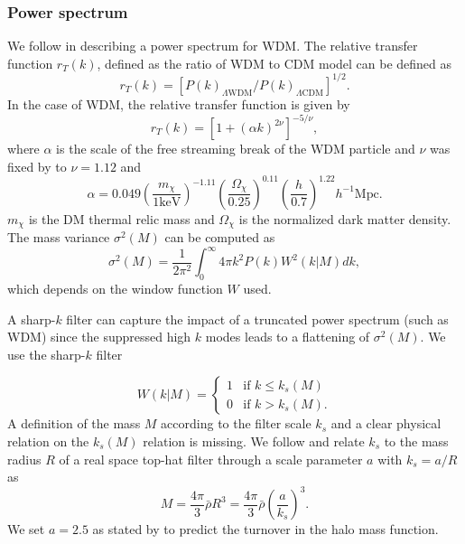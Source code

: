 \documentclass[a4paper,11pt]{article}
\begin{document}
\subsubsection{Power spectrum}\label{sec:power_spectrum}
We follow \cite{Viel:2005p13838} in describing a power spectrum for WDM. The relative transfer function $r_T(k)$, defined as the ratio of WDM to CDM model can be defined as
\begin{equation}
	r_T(k) = \left[P(k)_{\text{$\Lambda$WDM}}/P(k)_{\text{$\Lambda$CDM}} \right]^{1/2}.
\end{equation}
In the case of WDM, the relative transfer function is given by \cite{Bode:2001p13951}
\begin{equation}
	r_T(k) = \left[1 + \left(\alpha k \right)^{2\nu}\right]^{-5/\nu},
\end{equation}
where $\alpha$ is the scale of the free streaming break of the WDM particle and $\nu$ was fixed by \cite{Viel:2005p13838} to $\nu = 1.12$ and
\begin{equation}
	\alpha = 0.049 \left(\frac{m_{\chi}}{1\text{keV}}\right)^{-1.11} \left(\frac{\Omega_{\chi}}{0.25}\right)^{0.11} \left(\frac{h}{0.7}\right)^{1.22}h^{-1}\text{Mpc}.
\end{equation}
$m_{\chi}$ is the DM thermal relic mass and $\Omega_{\chi}$ is the normalized dark matter density. The mass variance $\sigma^2(M)$ can be computed as
\begin{equation}
	\sigma^2(M) = \frac{1}{2\pi^2} \int_0^{\infty} 4 \pi k^2 P(k) W^2(k|M)dk,
\end{equation}
which depends on the window function $W$ used. 

A sharp-$k$ filter can capture the impact of a truncated power spectrum (such as WDM) since the suppressed high $k$ modes leads to a flattening of $\sigma^2(M)$. We use the sharp-$k$ filter

\begin{equation}
	W(k|M) =
	\begin{cases}
    1 & \text{if } k \le k_s(M)\\
    0 & \text{if } k > k_s(M).
	\end{cases}
\end{equation}
A definition of the mass $M$ according to the filter scale $k_s$ and a clear physical relation on the $k_s(M)$ relation is missing. We follow \cite{Benson:2013p13572} and relate $k_s$ to the mass radius $R$ of a real space top-hat filter through a scale parameter $a$ with $k_s = a/R$ as
\begin{equation}\label{eq:M_R}
	M = \frac{4\pi}{3} \bar{\rho}R^3 = \frac{4\pi}{3} \bar{\rho} \left(\frac{a}{k_s}\right)^3.
\end{equation}
We set $a=2.5$ as stated by \cite{Benson:2013p13572} to predict the turnover in the halo mass function.
\end{document}
